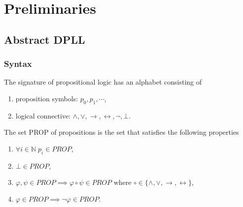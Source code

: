 \chapter{Preliminaries}
\section{Abstract DPLL}
\subsection{Syntax}
\begin{definition}
The signature of propositional logic has an alphabet consisting of
\begin{enumerate}
\item proposition symbols: $p_0, p_1, \cdots$,
\item logical connective: $\wedge, \vee, \rightarrow, \leftrightarrow, \neg, \bot$.
\end{enumerate}
\end{definition}

\begin{definition}
The set PROP of propositions is the set that satisfies the following properties
\begin{enumerate}
\item $\forall i \in \mathbb{N} \; p_i \in PROP$,
\item $\bot \in PROP$,
\item $\varphi, \psi \in PROP \implies \varphi \circ \psi \in PROP$ where $\circ \in \{\wedge, \vee, \rightarrow, \leftrightarrow\}$,
\item $\varphi \in PROP \implies \neg\varphi \in PROP$.
\end{enumerate}
\end{definition}

